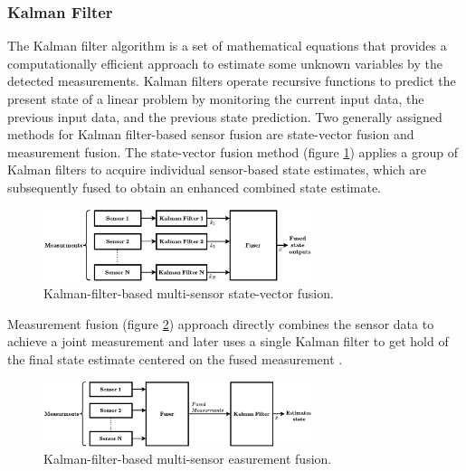 \subsubsection{Kalman Filter}

The Kalman filter algorithm is a set of mathematical equations that provides a computationally efficient approach to estimate some unknown variables by the detected measurements\cite{welch1995introduction}. Kalman filters operate recursive functions to predict the present state of a linear problem by monitoring the current input data, the previous input data, and the previous state prediction. Two generally assigned methods for Kalman filter-based sensor fusion are state-vector fusion and measurement fusion. The state-vector fusion method (figure \ref{fig:state_kalman}) applies a group of Kalman filters to acquire individual sensor-based state estimates, which are subsequently fused to obtain an enhanced combined state estimate.

\begin{figure}[!h]
  \centering
  \includegraphics[width=0.7\textwidth]{figures/kalman1.pdf}
  \caption{Kalman-filter-based multi-sensor state-vector fusion. \cite{mosallaei2007process}}
  \label{fig:state_kalman}
\end{figure}

Measurement fusion (figure \ref{fig:mesearurment_kalman}) approach directly combines the sensor data to achieve a joint measurement and later uses a single Kalman filter to get hold of the final state estimate centered on the fused measurement \cite{mosallaei2007process}.

\begin{figure}[!h]
  \centering
  \includegraphics[width=0.7\textwidth]{figures/kalman2.pdf}
  \caption{Kalman-filter-based multi-sensor easurement fusion. \cite{mosallaei2007process}}
  \label{fig:mesearurment_kalman}
\end{figure}

